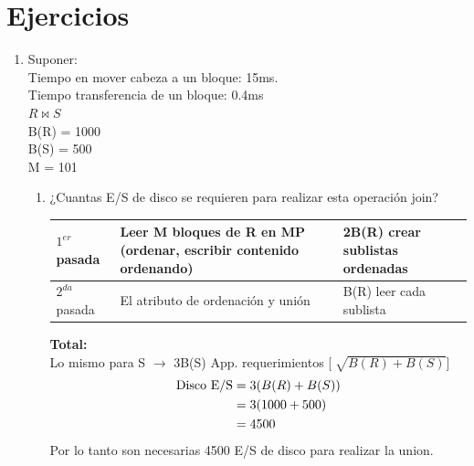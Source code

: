 \documentclass{templateNote}
\begin{document}


\portada
\margenes 
\tableofcontents
\newpage


\section{Ejercicios}

\begin{enumerate}
    \item Suponer: \\
    Tiempo en mover cabeza a un bloque: 15ms.\\
    Tiempo transferencia de un bloque: 0.4ms \\
    \underline{$R \Join S$}\\
    \hspace*{0.25cm} B(R) = 1000 \\
    \hspace*{0.25cm} B(S) = 500 \\
    \hspace*{0.25cm} M = 101 \\
    \begin{enumerate}[label=\alph*)]
        \item ¿Cuantas E/S de disco se requieren para realizar esta operación join? \\

        \begin{tabular}{|m{2cm}|m{6cm}|m{4cm}|}
            \hline
            $1^{er}$ pasada & Leer M bloques de R en MP (ordenar, escribir contenido ordenando) & 2B(R) crear sublistas ordenadas \\
            \hline
            $2^{da}$ pasada & El atributo de ordenación y unión & B(R) leer cada sublista \\
            \hline
        \end{tabular}
        
        \vspace{0.5cm}
        \textbf{Total: }\\
        Lo mismo para S $\rightarrow$ 3B(S) App. requerimientos [$\sqrt[]{{B(R)+B(S)}}$]\\
        \begin{align*}
            \textnormal{Disco E/S} &= 3(B(R)+B(S)) \\
            &= 3(1000+500) \\
            &= 4500 \\ 
        \end{align*}
        Por lo tanto son necesarias 4500 E/S de disco para realizar la union.\\


\end{enumerate}
\end{enumerate}
\end{document}
